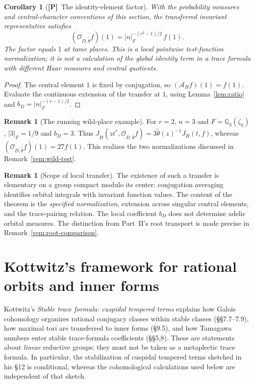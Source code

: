 \documentclass[11pt]{article}
\newcommand{\tH}{\widetilde H}
\newcommand{\Ptag}{\textnormal{\textbf{[P]}}}
\theoremstyle{plain}
\newtheorem{corollary}[theorem]{Corollary}
\theoremstyle{definition}
\newtheorem{remark}[theorem]{Remark}
\begin{document}
\begin{corollary}[\Ptag\ The identity-element factor]\label{cor:identity-factor}
With the probability measures and central-character conventions of this
section, the transferred invariant representative satisfies
\begin{equation}\label{eq:identity-factor}
\boxed{\quad(\mathcal O_{D,\widetilde\theta}f)(1)
=|n|_F^{-(r^2-1)/2}\,f(1).\quad}
\end{equation}
The factor equals $1$ at tame places. This is a local pointwise test-function
normalization; it is \emph{not} a calculation of the global identity term
in a trace formula with different Haar measures and central quotients.
\end{corollary}
\begin{proof}
The central element $1$ is fixed by conjugation, so
$(\mathcal A_Hf)(1)=f(1)$. Evaluate the continuous extension of the
transfer at $1$, using Lemma~\ref{lem:ratio} and
$b_D=|n|_F^{-(r-1)/2}$.
\end{proof}

\begin{remark}[The running wild-place example]
For $r=2$, $n=3$ and $F=\mathbb Q_3(\zeta_3)$,
$|3|_F=1/9$ and $b_D=3$. Thus
$J_{\tH}(z t^*,\mathcal O_{D,\widetilde\theta}f)=3\widetilde\theta(z)^{-1}J_H(t,f)$,
whereas $(\mathcal O_{D,\widetilde\theta}f)(1)=27f(1)$. This realizes the two
normalizations discussed in Remark~\ref{rem:wild-test}.
\end{remark}

\begin{remark}[Scope of local transfer]\label{rem:OI-scope}
The existence of such a transfer is elementary on a group compact
modulo its center: conjugation averaging identifies orbital integrals
with invariant function values. The content of the theorem is the
\emph{specified normalization}, extension across singular central
elements, and the trace-pairing relation. The local coefficient
$b_D$ does not determine adelic orbital measures. The distinction from Part~II's root transport is made precise in Remark~\ref{rem:root-comparison}.
\end{remark}


\section{Kottwitz's framework for rational orbits and inner forms}
\label{sec:kottwitz}
Kottwitz's \emph{Stable trace formula: cuspidal tempered terms}
\cite{Kottwitz84} explains how Galois cohomology organizes rational
conjugacy classes within stable classes (\S\S7.7--7.9), how maximal
tori are transferred to inner forms (\S9.5), and how Tamagawa
numbers enter stable trace-formula coefficients (\S\S5,8).
These are statements about \emph{linear} reductive groups; they
must not be taken as a metaplectic trace formula. In particular,
the stabilization of cuspidal tempered terms sketched in his \S12
is conditional, whereas the cohomological calculations used below
are independent of that sketch.
\end{document}
